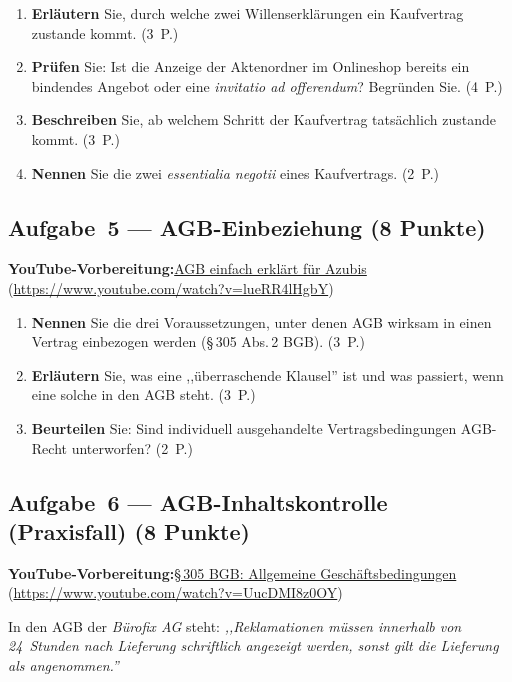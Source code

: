 \documentclass[11pt, a4paper]{article}
\begin{document}
\begin{enumerate}[label=(\alph*)]
  \item \textbf{Erläutern} Sie, durch welche zwei Willenserklärungen ein Kaufvertrag zustande kommt. \hfill (3~P.)
  \item \textbf{Prüfen} Sie: Ist die Anzeige der Aktenordner im Onlineshop bereits ein bindendes Angebot oder eine \emph{invitatio ad offerendum}? Begründen Sie. \hfill (4~P.)
  \item \textbf{Beschreiben} Sie, ab welchem Schritt der Kaufvertrag tatsächlich zustande kommt. \hfill (3~P.)
  \item \textbf{Nennen} Sie die zwei \emph{essentialia negotii} eines Kaufvertrags. \hfill (2~P.)
\end{enumerate}

\subsection*{Aufgabe~5 --- AGB-Einbeziehung (8 Punkte)}

\noindent\textbf{\color{bfwAccent}YouTube-Vorbereitung:}\enspace \href{https://www.youtube.com/watch?v=lueRR4lHgbY}{AGB einfach erklärt für Azubis} (\url{https://www.youtube.com/watch?v=lueRR4lHgbY})

\medskip
\begin{enumerate}[label=(\alph*)]
  \item \textbf{Nennen} Sie die drei Voraussetzungen, unter denen AGB wirksam in einen Vertrag einbezogen werden (§\,305 Abs.\,2 BGB). \hfill (3~P.)
  \item \textbf{Erläutern} Sie, was eine ,,überraschende Klausel'' ist und was passiert, wenn eine solche in den AGB steht. \hfill (3~P.)
  \item \textbf{Beurteilen} Sie: Sind individuell ausgehandelte Vertragsbedingungen AGB-Recht unterworfen? \hfill (2~P.)
\end{enumerate}

\subsection*{Aufgabe~6 --- AGB-Inhaltskontrolle (Praxisfall) (8 Punkte)}

\noindent\textbf{\color{bfwAccent}YouTube-Vorbereitung:}\enspace \href{https://www.youtube.com/watch?v=UucDMI8z0OY}{§\,305 BGB: Allgemeine Geschäftsbedingungen} (\url{https://www.youtube.com/watch?v=UucDMI8z0OY})

\medskip
In den AGB der \emph{Bürofix AG} steht: \emph{,,Reklamationen müssen innerhalb von
24~Stunden nach Lieferung schriftlich angezeigt werden, sonst gilt die Lieferung als
angenommen.''}
\end{document}
